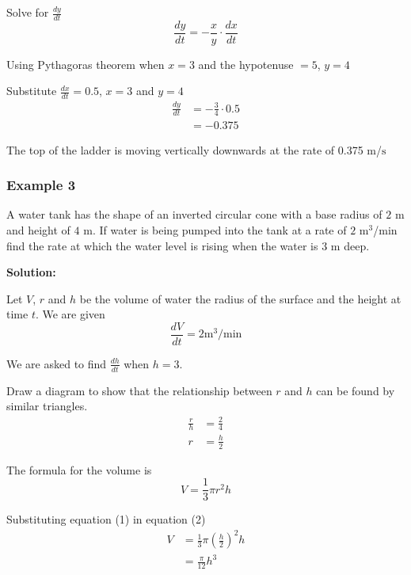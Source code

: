 Solve for $\frac{d y}{d t}$
\begin{equation*}\frac{d y}{d t} = -\frac{x}{y} \cdot \frac{d x}{d t}
\end{equation*}

Using Pythagoras theorem when $x =3$ and the hypotenuse $ =5$, $y =4$ 

Substitute $\frac{d x}{d t} =0.5$, $x =3$ and $y =4$
\begin{align*}\frac{d y}{d t} &  =  -\frac{3}{4} \cdot 0.5 \\
 &  =  -0.375\end{align*}

The top of the ladder is moving vertically downwards at the rate of 0.375 $\mbox{m}$/$\mbox{s}$ 

\subsubsection{Example 3}
A water tank has the shape of an inverted circular cone with a base radius of $2$ $\mbox{m}$ and height of $4$ $\mbox{m}$. If water is being pumped into
the tank at a rate of $2$ $\mathrm{m}^{3}$/$\mbox{min}$ find the rate at which the water level is rising when the water is $3$ $\mbox{m}$ deep. 

\textbf{Solution:} 

Let
$V$, $r$ and $h$ be the volume of water the radius of the surface and the height at time $t$. We are given
\begin{equation*}\frac{d V}{d t} =2\text{}\mathrm{m}^{3}/\mbox{min}
\end{equation*}

We are asked to find $\frac{d h}{d t}$ when $h =3$. 

Draw a diagram to show that the relationship between $r$ and $h$ can be found by similar triangles.
\begin{align}\frac{r}{h} &  = \frac{2}{4} \nonumber  \\
r &  = \frac{h}{2} \tag{1}\end{align}

The formula for the volume is
\begin{equation}V =\frac{1}{3} \pi  r^{2} h\tag{2}
\end{equation}

Substituting equation (1) in equation (2)
\begin{align*}V &  = \frac{1}{3} \pi  \genfrac{(}{)}{}{}{h}{2}^{2} h \\
 &  = \frac{\pi }{12} h^{3}\end{align*}

